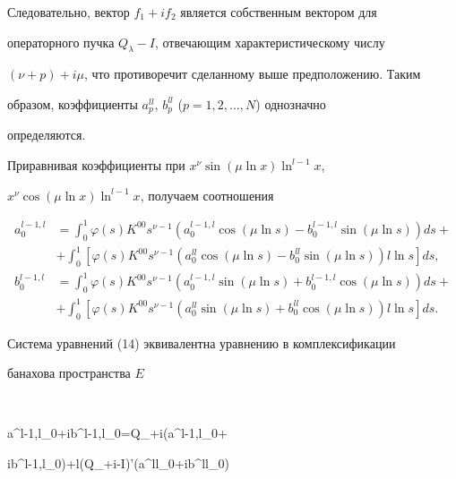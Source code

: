  


Следовательно, вектор $f_1+if_2$ является собственным вектором для 


операторного пучка $Q_\lambda-I$, отвечающим характеристическому числу 


$(\nu+p)+i\mu$, что противоречит сделанному выше предположению. Таким 


образом, коэффициенты $a^{ll}_p$, $b^{ll}_p$ ($p=1,2,\dotsc,N$) однозначно 


определяются. 


 


Приравнивая коэффициенты при $x^\nu\sin(\mu\ln x)\ln^{l-1}x$, 


$x^\nu\cos(\mu\ln x)\ln^{l-1}x$, получаем соотношения 


\begin{equation} 


\begin{split} 


a^{l-1,l}_0&=\int^1_0\varphi(s)K^{00}s^{\nu-1}(a^{l-1,l}_0\cos(\mu\ln s) 


-b^{l-1,l}_0\sin(\mu\ln s))ds+\\ 


&+\int^1_0[\varphi(s)K^{00}s^{\nu-1} 


(a^{ll}_0\cos(\mu\ln s)-b^{ll}_0\sin(\mu\ln s))l\ln s]ds,\\ 


% 


b^{l-1,l}_0&=\int^1_0\varphi(s)K^{00}s^{\nu-1} 


(a^{l-1,l}_0\sin(\mu\ln s)+b^{l-1,l}_0\cos(\mu\ln s))ds+\\ 


&+\int^1_0[\varphi(s)K^{00}s^{\nu-1} 


(a^{ll}_0\sin(\mu\ln s)+b^{ll}_0\cos(\mu\ln s))l\ln s]ds. 


\end{split} 


\end{equation} 


 


Система уравнений (14) эквивалентна уравнению в комплексификации 


банахова пространства $E$ 


$$ 


a^{l-1,l}_0+ib^{l-1,l}_0=Q_{\nu+i\mu}(a^{l-1,l}_0+ 


ib^{l-1,l}_0)+l(Q_{\nu+i\mu}-I)'(a^{ll}_0+ib^{ll}_0) 


